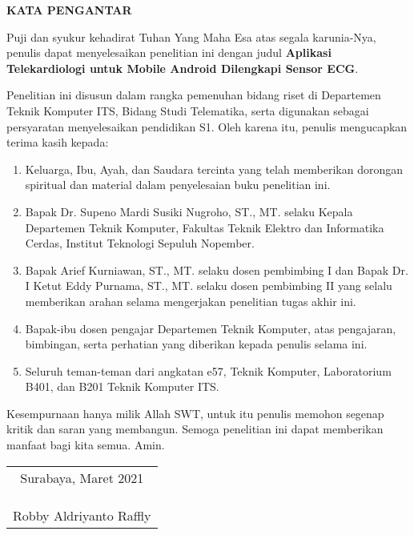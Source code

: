 \begin{center}
\Large\textbf{KATA PENGANTAR}
\end{center}
\vspace{1ex}

\setlength{\parindent}{0.9cm} Puji dan syukur kehadirat Tuhan Yang Maha Esa atas segala karunia-Nya, penulis  dapat menyelesaikan penelitian ini dengan judul \textbf{Aplikasi Telekardiologi untuk Mobile Android Dilengkapi Sensor ECG}.
\vspace{1ex}

Penelitian ini disusun dalam rangka pemenuhan bidang riset di Departemen Teknik Komputer ITS, Bidang  Studi Telematika, serta digunakan sebagai persyaratan menyelesaikan pendidikan  S1. Oleh karena itu, penulis mengucapkan terima kasih kepada:
\vspace{1ex}

\begin{enumerate}[nolistsep]
  \item Keluarga, Ibu, Ayah, dan Saudara tercinta yang telah memberikan dorongan spiritual dan material dalam penyelesaian buku penelitian ini.
  \item Bapak Dr. Supeno Mardi Susiki Nugroho, ST., MT. selaku Kepala Departemen Teknik Komputer, Fakultas Teknik Elektro dan Informatika Cerdas, Institut Teknologi Sepuluh Nopember.
  \item Bapak Arief Kurniawan, ST., MT. selaku dosen pembimbing I dan Bapak Dr. I Ketut Eddy Purnama, ST., MT. selaku dosen pembimbing II yang selalu memberikan arahan selama mengerjakan penelitian tugas akhir ini.  
  \item Bapak-ibu dosen pengajar Departemen Teknik Komputer, atas pengajaran, bimbingan, serta perhatian yang diberikan kepada penulis selama ini.
  \item Seluruh teman-teman dari angkatan e57, Teknik Komputer, Laboratorium B401, dan B201 Teknik Komputer ITS.
\end{enumerate}
\vspace{1ex}

Kesempurnaan hanya milik Allah SWT, untuk itu penulis memohon segenap kritik dan saran yang  membangun. Semoga penelitian ini dapat memberikan manfaat bagi kita semua. Amin.
\begin{flushright}
\begin{tabular}[b]{c}
  Surabaya, Maret 2021
  \\
  \\
  \\
  \\
  Robby Aldriyanto Raffly
\end{tabular}
\end{flushright}